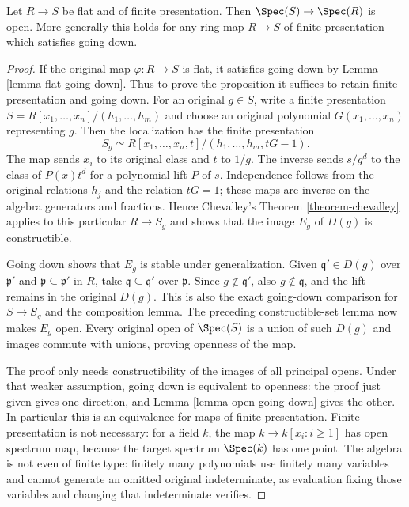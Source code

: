 \begin{proposition}
\label{proposition-fppf-open}
Let $R \to S$ be flat and of finite presentation.
Then $\Spec(S) \to \Spec(R)$ is open.
More generally this holds for any ring map $R \to S$ of
finite presentation which satisfies going down.
\end{proposition}

\begin{proof}
If the original map $\varphi:R\to S$ is flat, it
satisfies going down by Lemma \ref{lemma-flat-going-down}.
Thus to prove the proposition it suffices to retain
finite presentation and going down.
For an original $g\in S$, write a finite presentation
$S=R[x_1,\ldots,x_n]/(h_1,\ldots,h_m)$ and choose
an original polynomial $G(x_1,\ldots,x_n)$ representing
$g$. Then the localization has the finite presentation
$$
S_g\simeq
R[x_1,\ldots,x_n,t]/(h_1,\ldots,h_m,tG-1).
$$
The map sends $x_i$ to its original class and $t$
to $1/g$. The inverse sends $s/g^d$ to the class
of $P(x)t^d$ for a polynomial lift $P$ of $s$.
Independence follows from the original relations
$h_j$ and the relation $tG=1$; these maps are
inverse on the algebra generators and fractions.
Hence Chevalley's Theorem \ref{theorem-chevalley}
applies to this particular $R\to S_g$ and shows
that the image $E_g$ of $D(g)$ is constructible.

Going down shows that $E_g$ is stable under
generalization. Given $\mathfrak q'\in D(g)$ over
$\mathfrak p'$ and $\mathfrak p\subseteq\mathfrak p'$
in $R$, take $\mathfrak q\subseteq\mathfrak q'$
over $\mathfrak p$. Since $g\notin\mathfrak q'$,
also $g\notin\mathfrak q$, and the lift remains
in the original $D(g)$. This is also the exact
going-down comparison for $S\to S_g$ and the
composition lemma. The preceding constructible-set
lemma now makes $E_g$ open. Every original open
of $\Spec(S)$ is a union of such $D(g)$ and images
commute with unions, proving openness of the map.

The proof only needs constructibility of the
images of all principal opens. Under that weaker
assumption, going down is equivalent to openness:
the proof just given gives one direction, and
Lemma \ref{lemma-open-going-down} gives the other.
In particular this is an equivalence for maps of
finite presentation. Finite presentation is not
necessary: for a field $k$, the map
$k\to k[x_i:i\geq1]$ has open spectrum map,
because the target spectrum $\Spec(k)$ has one
point. The algebra is not even of finite type:
finitely many polynomials use finitely many
variables and cannot generate an omitted original
indeterminate, as evaluation fixing those variables
and changing that indeterminate verifies.


\end{proof}
